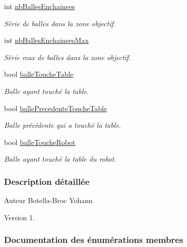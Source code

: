 \begin{DoxyCompactItemize}
int \hyperlink{class_statistiques_seance_ac7f71fc7b017bb17d4576f954120c7a0}{nb\+Balles\+Enchainees}
\begin{DoxyCompactList}\small\item\em Série de balles dans la zone objectif. \end{DoxyCompactList}\item 
int \hyperlink{class_statistiques_seance_a3e64397e87d453efb42b2545df1a8e90}{nb\+Balles\+Enchainees\+Max}
\begin{DoxyCompactList}\small\item\em Série max de balles dans la zone objectif. \end{DoxyCompactList}\item 
bool \hyperlink{class_statistiques_seance_ad428a6da4f5615a7682c8fa4fb597ce3}{balle\+Touche\+Table}
\begin{DoxyCompactList}\small\item\em Balle ayant touché la table. \end{DoxyCompactList}\item 
bool \hyperlink{class_statistiques_seance_a36681be0a5a9fc48c4c332606a0418ad}{balle\+Precedente\+Touche\+Table}
\begin{DoxyCompactList}\small\item\em Balle précédente qui a touché la table. \end{DoxyCompactList}\item 
bool \hyperlink{class_statistiques_seance_af6747af0965a82d7d59a248682bbb575}{balle\+Touche\+Robot}
\begin{DoxyCompactList}\small\item\em Balle ayant touché la table du robot. \end{DoxyCompactList}\end{DoxyCompactItemize}


\subsubsection{Description détaillée}
\begin{DoxyAuthor}{Auteur}
Botella-\/\+Broc Yohann
\end{DoxyAuthor}
\begin{DoxyVersion}{Version}
1. 
\end{DoxyVersion}


\subsubsection{Documentation des énumérations membres}
\mbox{\label{class_statistiques_seance_aa839f5192cbadd7c3fb3651d62eff8b5}} 
